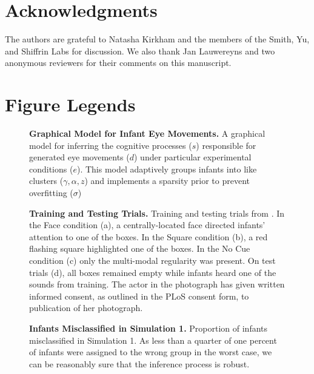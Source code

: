 \documentclass[12pt]{article}
\begin{document}
\section*{Acknowledgments}
The authors are grateful to Natasha Kirkham and the members of the Smith, Yu, and Shiffrin Labs for discussion. We also thank Jan Lauwereyns and two anonymous reviewers for their comments on this manuscript.

\clearpage


\section*{Figure Legends}

\begin{figure}[!h]
\caption{\textbf{Graphical Model for Infant Eye Movements.} A graphical model for inferring the cognitive processes ($s$) responsible for generated eye movements ($d$) under particular experimental conditions ($e$). This model adaptively groups infants into like clusters ($\gamma, \alpha, z$) and implements a sparsity prior to prevent overfitting ($\sigma$)}
\label{fig:plates}
\end{figure}

\begin{figure}[!h]
\caption{\textbf{Training and Testing Trials.} Training and testing trials from \cite{Wu2010a}. In the Face condition (a), a centrally-located face directed infants' attention to one of the boxes. In the Square condition (b), a red flashing square highlighted one of the boxes. In the No Cue condition (c) only the multi-modal regularity was present. On test trials (d), all boxes remained empty while infants heard one of the sounds from training. The actor in the photograph has given written informed consent, as outlined in the PLoS consent form, to publication of her photograph.}
\label{fig:conds}
\end{figure}

\begin{figure}[!h]
\caption{\textbf{Infants Misclassified in Simulation 1.} Proportion of infants misclassified in Simulation 1. As less than a quarter of one percent of infants were assigned to the wrong group in the worst case, we can be reasonably sure that the inference process is robust.}
\label{fig:sim1}
\end{figure}
\end{document}
